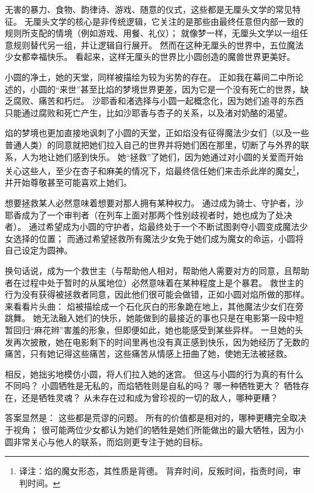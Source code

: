 无害的暴力、食物、韵律诗、游戏、随意的仪式，这些都是无厘头文学的常见特征。
无厘头文学的核心是非传统逻辑，它关注的是那些由最终任意但内部一致的规则所支配的情境（例如游戏、用餐、礼仪）；
就像梦一样，无厘头文学以一组任意规则替代另一组，并让逻辑自行展开。
然而在这种无厘头的世界中，五位魔法少女都幸福快乐。
看起来，这样无厘头的世界比小圆创造的魔兽世界更美好。

小圆的净土，她的天堂，同样被描绘为较为劣势的存在。
正如我在幕间二中所论述的，小圆的“来世”甚至比焰的梦境世界更差，因为它是一个没有死亡的世界，缺乏腐败、痛苦和朽烂。
沙耶香和渚选择与小圆一起概念化，因为她们追寻的东西只能通过腐败和死亡产生，比如沙耶香与杏子的关系，以及渚对奶酪的渴望。

焰的梦境也更加直接地讽刺了小圆的天堂，正如焰没有征得魔法少女们（以及一些普通人类）的同意就把她们拉入自己的世界并将她们困在那里，切断了与外界的联系，人为地让她们感到快乐。
她“拯救”了她们，因为她通过对小圆的关爱而开始关心这些人，至少在杏子和麻美的情况下，焰最终信任她们来击杀此岸的魔女\footnote{%
    译注：焰的魔女形态，其性质是背德。
    背弃时间，反叛时间，指责时间，审判时间。
}，并开始尊敬甚至可能喜欢上她们。

想要拯救某人必然意味着想要对那人拥有某种权力。
通过成为骑士、守护者，沙耶香成为了一个审判者（在列车上面对那两个性别歧视者时，她也成为了处决者）。
通过希望成为小圆的守护者，焰最终处于一个不断试图剥夺小圆变成魔法少女选择的位置；
而通过希望拯救所有魔法少女免于她们成为魔女的命运，小圆将自己设定为圆神。

换句话说，成为一个救世主（与帮助他人相对，帮助他人需要对方的同意，且帮助者在过程中处于暂时的从属地位）必然意味着在某种程度上是个暴君。
救世主的行为没有获得被拯救者同意，因此他们很可能会做错，正如小圆对焰所做的那样。
来看看片头曲：
焰被描绘成一个石化灰白的形象跪在地上，其他魔法少女们在旁跳舞。
她无法融入她们的快乐，她能做到的最接近的事也只是在电影第一段中短暂回归“麻花辫”害羞的形象，但即便如此，她也能感受到某些异样。
一旦她的头发再次披散，她在电影剩下的时间里再也没有真正感到快乐，因为她经历了无数的痛苦，只有她记得这些痛苦，这些痛苦从情感上扭曲了她，使她无法被拯救。

相反，她拙劣地模仿小圆，将人们拉入她的迷宫。
但这与小圆的行为真的有什么不同吗？
小圆牺牲是无私的，而焰牺牲则是自私的吗？
哪一种牺牲更大？
牺牲存在，还是牺牲灵魂？
从未存在过和成为曾珍视的一切的敌人，哪种更糟？

答案显然是：
这些都是荒谬的问题。
所有的价值都是相对的，哪种更糟完全取决于视角；
很可能两位少女都认为她们的牺牲是她们所能做出的最大牺牲，因为小圆非常关心与他人的联系，而焰则更专注于她的目标。

